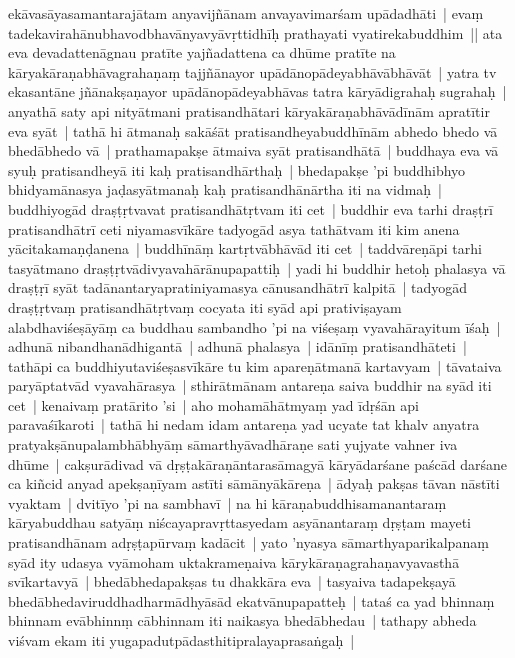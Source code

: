 \documentclass[article,a4paper]{memoir}
\begin{document}
	  \pstart ekā\-vasā\-yasamantarajā\-tam anyavijñā\-nam anvayavimarśam upā\-dadhā\-ti | evaṃ tadekavirahā\-nubhavodbhavā\-nyavyā\-vṛttidhī\-ḥ prathayati vyatirekabuddhim || \label{thakur75-125.26} ata eva devadattenā\-gnau pratī\-te yajñadattena ca dhū\-me pratī\-te na kā\-ryakā\-raṇabhā\-vagrahaṇaṃ tajjñā\-nayor upā\-dā\-nopā\-deyabhā\-vā\-bhā\-vā\-t | yatra tv ekasantā\-ne jñā\-nakṣaṇayor upā\-dā\-nopā\-deyabhā\-vas tatra kā\-ryā\-digrahaḥ sugrahaḥ | anyathā\- saty api nityā\-tmani pratisandhā\-tari kā\-ryakā\-raṇabhā\-vā\-dī\-nā\-m apratī\-tir eva syā\-t | \label{thakur75-125.30} tathā\- hi ā\-tmanaḥ sakā\-śā\-t pratisandheyabuddhī\-nā\-m abhedo bhedo vā\- bhedā\-bhedo vā\- | \label{thakur75-125.31} prathamapakṣe ā\-tmaiva syā\-t pratisandhā\-tā\- | buddhaya eva vā\- syuḥ pratisandheyā\- iti kaḥ pratisandhā\-rthaḥ | \label{thakur75-125.32} bhedapakṣe 'pi buddhibhyo bhidyamā\-nasya jaḍasyā\-tmanaḥ kaḥ pratisandhā\-nā\-rtha iti na vidmaḥ | \label{thakur75-125.33} buddhiyogā\-d draṣṭṛtvavat pratisandhā\-tṛtvam iti cet | \label{thakur75-126.1} buddhir eva tarhi draṣṭrī\- pratisandhā\-trī\- ceti niyamasvī\-kā\-re tadyogā\-d asya tathā\-tvam iti kim anena yā\-citakamaṇḍanena | \label{thakur75-126.2} buddhī\-nā\-ṃ kartṛtvā\-bhā\-vā\-d iti cet | \label{thakur75-126.2a} taddvā\-reṇā\-pi tarhi tasyā\-tmano draṣṭṛtvā\-divyavahā\-rā\-nupapattiḥ | yadi hi buddhir hetoḥ phalasya vā\- draṣṭṛī\- syā\-t tadā\-nantaryapratiniyamasya cā\-nusandhā\-trī\- kalpitā\- | tadyogā\-d draṣṭṛtvaṃ pratisandhā\-tṛtvaṃ cocyata iti syā\-d api prativiṣayam alabdhaviśeṣā\-yā\-ṃ ca buddhau sambandho 'pi na viśeṣaṃ vyavahā\-rayitum ī\-śaḥ | adhunā\- nibandhanā\-dhigantā\- | adhunā\- phalasya | idā\-nī\-ṃ pratisandhā\-teti | tathā\-pi ca buddhiyutaviśeṣasvī\-kā\-re tu kim apareṇā\-tmanā\- kartavyam | tā\-vataiva paryā\-ptatvā\-d vyavahā\-rasya | \label{thakur75-126.9} sthirā\-tmā\-nam antareṇa saiva buddhir na syā\-d iti cet | \label{thakur75-126.9a} kenaivaṃ pratā\-rito 'si | aho mohamā\-hā\-tmyaṃ yad ī\-dṛśā\-n api paravaśī\-karoti | tathā\- hi nedam idam antareṇa yad ucyate tat khalv anyatra pratyakṣā\-nupalambhā\-bhyā\-ṃ sā\-marthyā\-vadhā\-raṇe sati yujyate vahner iva dhū\-me | cakṣurā\-divad vā\- dṛṣṭakā\-raṇā\-ntarasā\-magyā\- kā\-ryā\-darśane paścā\-d darśane ca kiñcid anyad apekṣaṇī\-yam astī\-ti sā\-mā\-nyā\-kā\-reṇa | \label{thakur75-126.14} ā\-dyaḥ pakṣas tā\-van nā\-stī\-ti vyaktam | dvitī\-yo 'pi na sambhavī\- | na hi kā\-raṇabuddhisamanantaraṃ kā\-ryabuddhau satyā\-ṃ niścayapravṛttasyedam asyā\-nantaraṃ dṛṣṭam mayeti pratisandhā\-nam adṛṣṭapū\-rvaṃ kadā\-cit | yato 'nyasya sā\-marthyaparikalpanaṃ syā\-d ity udasya vyā\-moham uktakrameṇaiva kā\-rykā\-raṇagrahaṇavyavasthā\- svī\-kartavyā\- | \label{thakur75-126.18} bhedā\-bhedapakṣas tu dhakkā\-ra eva | tasyaiva tadapekṣayā\- bhedā\-bhedaviruddhadharmā\-dhyā\-sā\-d ekatvā\-nupapatteḥ | tataś ca yad bhinnaṃ bhinnam evā\-bhinnṃ cā\-bhinnam iti naikasya bhedā\-bhedau | tathapy abheda viśvam ekam iti yugapadutpā\-dasthitipralayaprasaṅgaḥ | 
\end{document}
